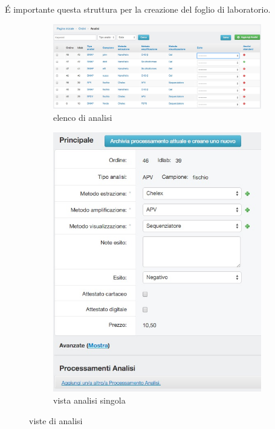 É importante questa struttura per la creazione del \textsf{foglio di laboratorio}.

\begin{figure}
 \centering
 \begin{subfigure}[b]{0.85\textwidth}
   \includegraphics[width=\textwidth]{images/admin-analisi-tab} 
   \caption{elenco di analisi}
   \label{fig:admin-analisi-tab}
 \end{subfigure}
 \begin{subfigure}[b]{0.55\textwidth}
   \includegraphics[width=\textwidth]{images/admin-analisi}
   \caption{vista analisi singola}
   \label{fig:admin-analisi}
 \end{subfigure}
 \caption{viste di analisi}
\end{figure}

